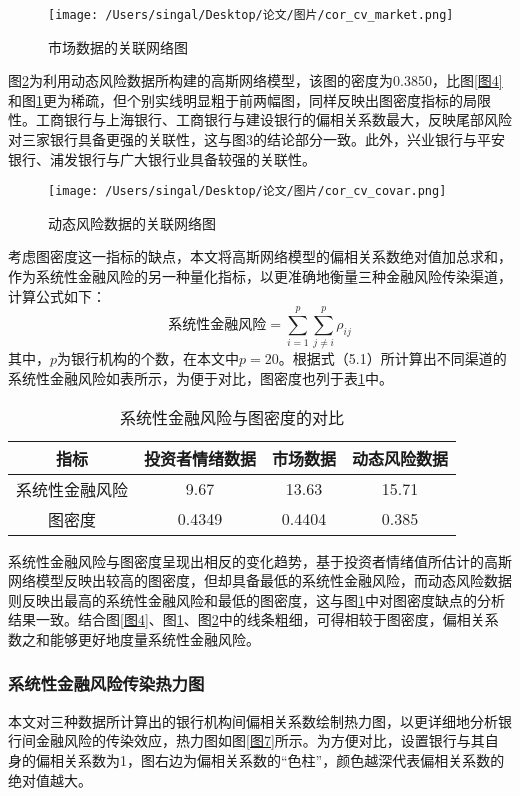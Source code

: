 \documentclass[lang=cn]{elegantpaper}
\begin{document}
\begin{figure}[htb]
    \centering
    \texttt{[image: /Users/singal/Desktop/论文/图片/cor\_cv\_market.png]}
    \caption{市场数据的关联网络图}
    \label{图5}
\end{figure}

图\ref{图6}为利用动态风险数据所构建的高斯网络模型，该图的密度为0.3850，比图\ref{图4}和图\ref{图5}更为稀疏，但个别实线明显粗于前两幅图，同样反映出图密度指标的局限性。工商银行与上海银行、工商银行与建设银行的偏相关系数最大，反映尾部风险对三家银行具备更强的关联性，这与图3的结论部分一致。此外，兴业银行与平安银行、浦发银行与广大银行业具备较强的关联性。
\begin{figure}[h]
    \centering
    \texttt{[image: /Users/singal/Desktop/论文/图片/cor\_cv\_covar.png]}
    \caption{动态风险数据的关联网络图}
    \label{图6}
\end{figure}

考虑图密度这一指标的缺点，本文将高斯网络模型的偏相关系数绝对值加总求和，作为系统性金融风险的另一种量化指标，以更准确地衡量三种金融风险传染渠道，计算公式如下：
\begin{equation}
    \text{系统性金融风险}=\sum_{i=1}^{p}\sum_{j\neq i}^{p} \rho_{ij}
\end{equation}
其中，$p$为银行机构的个数，在本文中$p=20$。根据式（5.1）所计算出不同渠道的系统性金融风险如表所示，为便于对比，图密度也列于表\ref{表6}中。

\begin{table}[H]
    \centering
    \caption{系统性金融风险与图密度的对比}
    \label{表6}
    \begin{tabular*}{\textwidth}{@{}@{\extracolsep{\fill}}cccc@{}}
    \toprule
    指标      & 投资者情绪数据 & 市场数据   & 动态风险数据 \\ \midrule
    系统性金融风险 & 9.67    & 13.63  & 15.71  \\
    图密度     & 0.4349  & 0.4404 & 0.385  \\ \bottomrule
    \end{tabular*}
\end{table}
系统性金融风险与图密度呈现出相反的变化趋势，基于投资者情绪值所估计的高斯网络模型反映出较高的图密度，但却具备最低的系统性金融风险，而动态风险数据则反映出最高的系统性金融风险和最低的图密度，这与图\ref{图5}中对图密度缺点的分析结果一致。结合图\ref{图4}、图\ref{图5}、图\ref{图6}中的线条粗细，可得相较于图密度，偏相关系数之和能够更好地度量系统性金融风险。

\subsubsection{系统性金融风险传染热力图}
本文对三种数据所计算出的银行机构间偏相关系数绘制热力图，以更详细地分析银行间金融风险的传染效应，热力图如图\ref{图7}所示。为方便对比，设置银行与其自身的偏相关系数为1，图右边为偏相关系数的“色柱”，颜色越深代表偏相关系数的绝对值越大。
\end{document}
